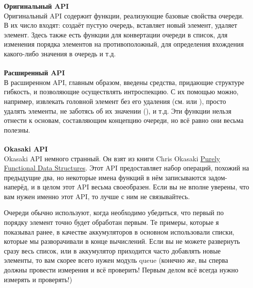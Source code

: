 \begin{minipage}{1.0\linewidth}
    \textbf{Оригинальный API}\\
    Оригинальный API содержит функции, реализующие базовые свойства очереди.
    В их число входят:  создаёт пустую очередь,  вставляет новый элемент,  удаляет элемент. Здесь также есть функции для конвертации очереди в список, для изменения порядка элементов на противоположный, для определения вхождения какого\--либо значения в очередь и т.д.\\
    \\
    \textbf{Расширенный API}\\
    В расширенном API, главным образом, введены средства, придающие структуре гибкость, и позволяющие осуществлять интроспекцию.
    С их помощью можно, например, извлекать головной элемент без его удаления (см.  или ), просто удалять элементы, не заботясь об их значении (), и т.д.
    Эти функции нельзя отнести к основам, составляющим концепцию очереди, но всё равно они весьма полезны.\\
    \\
    \textbf{Okasaki API}\\
    Okasaki API немного странный.
    Он взят из книги Chris Okasaki \href{http://books.google.ca/books?id=SxPzSTcTalAC&lpg=PP1&dq=chris\%20okasaki\%20purely\%20functional\%20data\%20structures&pg=PP1\#v=onepage&q=&f=false}{Purely Functional Data Structures}.
    Этот API предоставляет набор операций, похожий на предыдущие два, но некоторые имена функций в нём записываются задом\--наперёд, и в целом этот API весьма своеобразен.
    Если вы не вполне уверены, что вам нужен именно этот API, то лучше с ним не связывайтесь.\\
\end{minipage}

Очереди обычно используют, когда необходимо убедиться, что первый по порядку элемент точно будет обработан первым.
Те примеры, которые я показывал ранее, в качестве аккумуляторов в основном использовали списки, которые мы разворачивали в конце вычислений.
Если вы не можете развернуть сразу весь список, или в аккумулятор приходится часто добавлять новые элементы, то вам скорее всего нужен модуль queue (конечно же, вы сперва должны провести измерения и всё проверить!
Первым делом всё всегда нужно измерять и проверять!)
